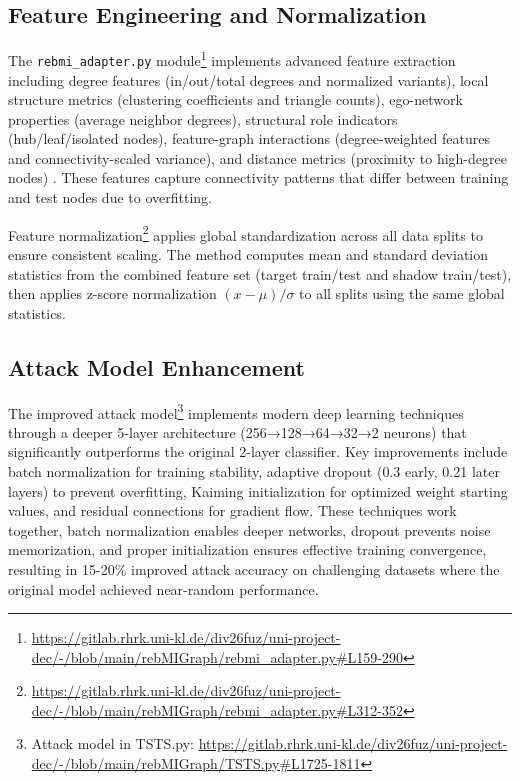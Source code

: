 \documentclass{article}
\begin{document}
\subsection{Feature Engineering and Normalization}
The \texttt{rebmi\_adapter.py} module\footnote{\url{https://gitlab.rhrk.uni-kl.de/div26fuz/uni-project-dec/-/blob/main/rebMIGraph/rebmi_adapter.py\#L159-290}} implements advanced feature extraction including degree features (in/out/total degrees and normalized variants), local structure metrics (clustering coefficients and triangle counts), ego-network properties (average neighbor degrees), structural role indicators (hub/leaf/isolated nodes), feature-graph interactions (degree-weighted features and connectivity-scaled variance), and distance metrics (proximity to high-degree nodes) \cite{olatunji2021membershipinferenceattackgraph}. These features capture connectivity patterns that differ between training and test nodes due to overfitting.

Feature normalization\footnote{\url{https://gitlab.rhrk.uni-kl.de/div26fuz/uni-project-dec/-/blob/main/rebMIGraph/rebmi_adapter.py\#L312-352}} applies global standardization across all data splits to ensure consistent scaling. The method computes mean and standard deviation statistics from the combined feature set (target train/test and shadow train/test), then applies z-score normalization $(x - \mu) / \sigma$ to all splits using the same global statistics.

\subsection{Attack Model Enhancement}
The improved attack model\footnote{Attack model in TSTS.py: \url{https://gitlab.rhrk.uni-kl.de/div26fuz/uni-project-dec/-/blob/main/rebMIGraph/TSTS.py\#L1725-1811}} implements modern deep learning techniques \cite{he2015delving} through a deeper 5-layer architecture (256→128→64→32→2 neurons) that significantly outperforms the original 2-layer classifier. Key improvements include batch normalization for training stability, adaptive dropout (0.3 early, 0.21 later layers) to prevent overfitting, Kaiming initialization for optimized weight starting values, and residual connections for gradient flow. These techniques work together, batch normalization enables deeper networks, dropout prevents noise memorization, and proper initialization ensures effective training convergence, resulting in 15-20\% improved attack accuracy on challenging datasets where the original model achieved near-random performance.
\end{document}
